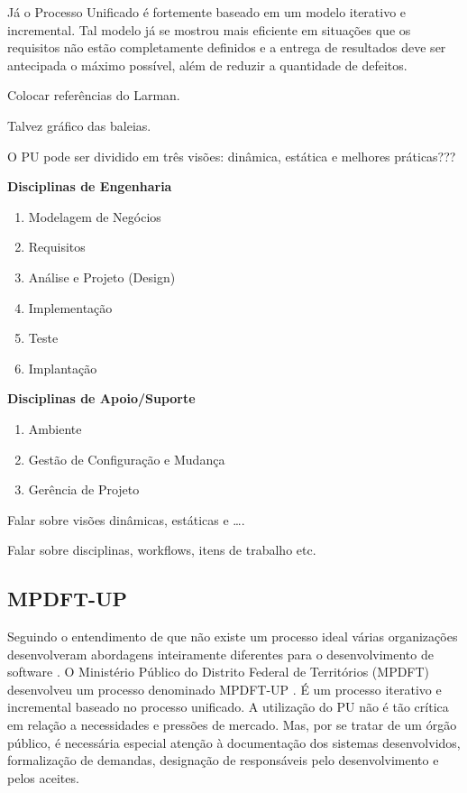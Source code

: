 \documentclass[
	article,			%
	11pt,				%
	oneside,			%
	a4paper,			%
	english,			%
	brazil,				%
	sumario=tradicional
	]{abntex2}
\begin{document}
Já o Processo Unificado é fortemente baseado em um modelo iterativo e
incremental. Tal modelo já se mostrou mais eficiente em situações que os
requisitos não estão completamente definidos e a entrega de resultados deve ser
antecipada o máximo possível, além de reduzir a quantidade de defeitos.

Colocar referências do Larman.

Talvez gráfico das baleias.

O PU pode ser dividido em três visões: dinâmica, estática e melhores práticas???

\textbf{Disciplinas de Engenharia}

\begin{enumerate}
   \item Modelagem de Negócios
   \item Requisitos
   \item Análise e Projeto (Design)
   \item Implementação
   \item Teste
   \item Implantação
\end{enumerate}

\textbf{Disciplinas de Apoio/Suporte}

\begin{enumerate}
   \item Ambiente
   \item Gestão de Configuração e Mudança
   \item Gerência de Projeto
\end{enumerate}

Falar sobre visões dinâmicas, estáticas e \ldots.

Falar sobre disciplinas, workflows, itens de trabalho etc.

\subsection{MPDFT-UP}

Seguindo o entendimento de que não existe um processo ideal várias organizações
desenvolveram abordagens inteiramente diferentes para o desenvolvimento de
software \cite{sommerville2007}. O Ministério Público do Distrito Federal de
Territórios (MPDFT) desenvolveu um processo denominado MPDFT-UP
\cite{mpdft-up}. É um processo iterativo e incremental baseado no processo
unificado. A utilização do PU não é tão crítica em relação a necessidades e
pressões de mercado. Mas, por se tratar de um órgão público, é necessária
especial atenção à documentação dos sistemas desenvolvidos, formalização de
demandas, designação de responsáveis pelo desenvolvimento e pelos aceites.
\end{document}
